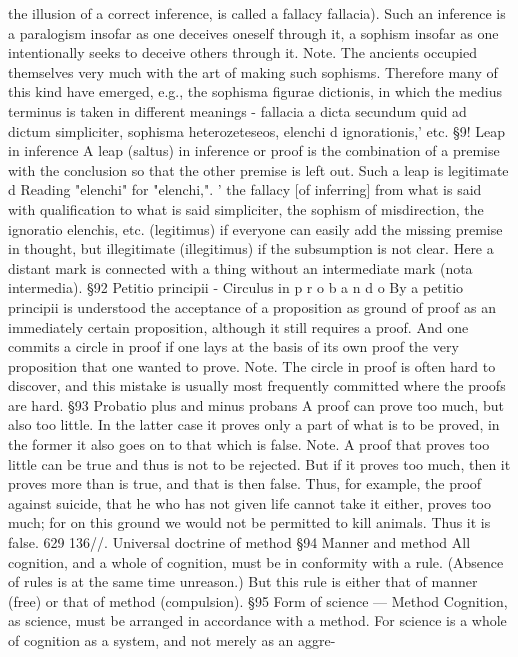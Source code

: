 the illusion of a correct inference, is called a fallacy {fallacia). Such an
inference is a paralogism insofar as one deceives oneself through it, a
sophism insofar as one intentionally seeks to deceive others through it.
Note.
The ancients occupied themselves very much with the art of making such
sophisms. Therefore many of this kind have emerged, e.g., the sophisma
figurae dictionis, in which the medius terminus is taken in different
meanings - fallacia a dicta secundum quid ad dictum simpliciter, sophisma
heterozeteseos, elenchi d ignorationis,' etc.
§9!
Leap in inference
A leap (saltus) in inference or proof is the combination of a premise with the
conclusion so that the other premise is left out. Such a leap is legitimate
d
Reading "elenchi" for "elenchi,".
' the fallacy [of inferring] from what is said with qualification to what is said simpliciter, the
sophism of misdirection, the ignoratio elenchis, etc.
(legitimus) if everyone can easily add the missing premise in thought, but
illegitimate (illegitimus) if the subsumption is not clear. Here a distant mark
is connected with a thing without an intermediate mark (nota intermedia).
§92
Petitio principii - Circulus in p r o b a n d o
By a petitio principii is understood the acceptance of a proposition as
ground of proof as an immediately certain proposition, although it still
requires a proof. And one commits a circle in proof if one lays at the basis of
its own proof the very proposition that one wanted to prove.
Note.
The circle in proof is often hard to discover, and this mistake is usually
most frequently committed where the proofs are hard.
§93
Probatio plus and minus probans
A proof can prove too much, but also too little. In the latter case it proves
only a part of what is to be proved, in the former it also goes on to that
which is false.
Note.
A proof that proves too little can be true and thus is not to be rejected. But
if it proves too much, then it proves more than is true, and that is then
false. Thus, for example, the proof against suicide, that he who has not
given life cannot take it either, proves too much; for on this ground we
would not be permitted to kill animals. Thus it is false.
629
136//.
Universal doctrine of method
§94
Manner and method
All cognition, and a whole of cognition, must be in conformity with a rule.
(Absence of rules is at the same time unreason.) But this rule is either that
of manner (free) or that of method (compulsion).
§95
Form of science — Method
Cognition, as science, must be arranged in accordance with a method. For
science is a whole of cognition as a system, and not merely as an aggre-
}
